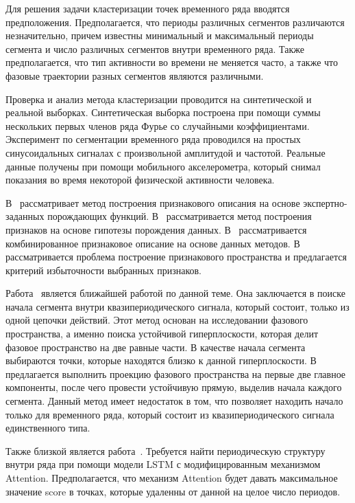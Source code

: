 Для решения задачи кластеризации точек временного ряда вводятся предположения. 
Предполагается, что периоды различных сегментов различаются незначительно, причем известны минимальный и максимальный периоды сегмента и число различных сегментов внутри временного ряда. 
Также предполагается, что тип активности во времени не меняется часто, а также что фазовые траектории разных сегментов являются различными. 

Проверка и анализ метода кластеризации проводится на синтетической и реальной выборках.
Синтетическая выборка построена при помощи суммы нескольких первых членов ряда Фурье со случайными коэффициентами.
Эксперимент по сегментации временного ряда проводился на простых синусоидальных сигналах с произвольной амплитудой и частотой. 
Реальные данные получены при помощи мобильного акселерометра, который снимал показания во время некоторой физической активности человека. 

В~\cite{kwapisz2010} рассматривает метод построения признакового описания на основе экспертно-заданных порождающих функций.
В~\cite{lukashin2003} рассматривается метод построения признаков на основе гипотезы порождения данных. 
В~\cite{Ivkin2015} рассматривается комбинированное признаковое описание на основе данных методов. 
В~\cite{Katrutsa2015} рассматривается проблема построение признакового пространства и предлагается критерий избыточности выбранных признаков.

Работа~\cite{motrenko2015} является ближайшей работой по данной теме. Она заключается в поиске начала сегмента внутри квазипериодического сигнала, который состоит, только из одной цепочки действий. Этот метод основан на исследовании фазового пространства, а именно поиска устойчивой гиперплоскости, которая делит фазовое пространство на две равные части. В качестве начала сегмента выбираются точки, которые находятся близко к данной гиперплоскости. В~\cite{motrenko2015} предлагается выполнить проекцию фазового пространства на первые две главное компоненты, после чего провести устойчивую прямую, выделив начала каждого сегмента. 
Данный метод имеет недостаток в том, что позволяет находить начало только для временного ряда, который состоит из квазипериодического сигнала единственного типа.


Также близкой является работа~\cite{cinar2018}. Требуется найти периодическую структуру внутри ряда при помощи модели LSTM с модифицированным механизмом Attention. Предполагается, что механизм Attention будет давать максимальное значение score в точках, которые удаленны от данной на целое число периодов.

